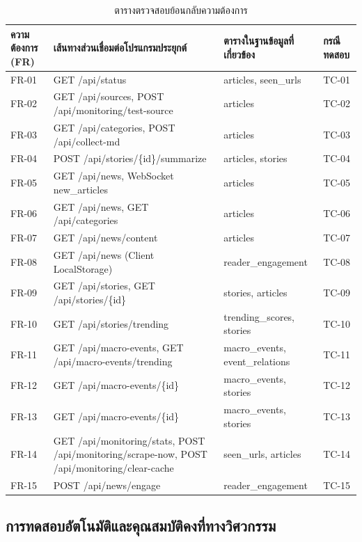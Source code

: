 \begin{table}[H]
\centering
\caption{ตารางตรวจสอบย้อนกลับความต้องการ}
\label{tab_rtm_matrix}
\begin{tabularx}{\textwidth}{|C{1.4cm}|Y|L{3.8cm}|C{1.2cm}|}
\hline
\textbf{ความต้องการ (FR)} & \textbf{เส้นทางส่วนเชื่อมต่อโปรแกรมประยุกต์} & \textbf{ตารางในฐานข้อมูลที่เกี่ยวข้อง} & \textbf{กรณีทดสอบ} \\
\hline
FR-01 & GET /api/status & articles, seen\_urls & TC-01 \\ \hline
FR-02 & GET /api/sources, POST /api/monitoring/test-source & articles & TC-02 \\ \hline
FR-03 & GET /api/categories, POST /api/collect-md & articles & TC-03 \\ \hline
FR-04 & POST /api/stories/\{id\}/summarize & articles, stories & TC-04 \\ \hline
FR-05 & GET /api/news, WebSocket new\_articles & articles & TC-05 \\ \hline
FR-06 & GET /api/news, GET /api/categories & articles & TC-06 \\ \hline
FR-07 & GET /api/news/content & articles & TC-07 \\ \hline
FR-08 & GET /api/news (Client LocalStorage) & reader\_engagement & TC-08 \\ \hline
FR-09 & GET /api/stories, GET /api/stories/\{id\} & stories, articles & TC-09 \\ \hline
FR-10 & GET /api/stories/trending & trending\_scores, stories & TC-10 \\ \hline
FR-11 & GET /api/macro-events, GET /api/macro-events/trending & macro\_events, event\_relations & TC-11 \\ \hline
FR-12 & GET /api/macro-events/\{id\} & macro\_events, stories & TC-12 \\ \hline
FR-13 & GET /api/macro-events/\{id\} & macro\_events, stories & TC-13 \\ \hline
FR-14 & GET /api/monitoring/stats, POST /api/monitoring/scrape-now, POST /api/monitoring/clear-cache & seen\_urls, articles & TC-14 \\ \hline
FR-15 & POST /api/news/engage & reader\_engagement & TC-15 \\
\hline
\end{tabularx}
\end{table}

\subsection{การทดสอบอัตโนมัติและคุณสมบัติคงที่ทางวิศวกรรม}

